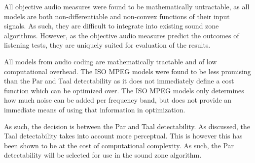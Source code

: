 All objective audio measures were found to be mathematically untractable, as all models are both non-differentiable and 
non-convex functions of their input signals.
As such, they are difficult to integrate into existing sound zone algorithms.
However, as the objective audio measures predict the outcomes of listening tests, they are uniquely suited for evaluation
of the results.

All models from audio coding are mathematically tractable and of low computational overhead.
The ISO MPEG models were found to be less promising than the Par and Taal detectability as it does not immediately 
define a cost function which can be optimized over.
The ISO MPEG models only determines how much noise can be added per frequency band, but does not provide an immediate 
means of using that information in optimization.

As such, the decision is between the Par and Taal detectability.
As discussed, the Taal detectability takes into account more perceptual.
This is however this has been shown to be at the cost of computational complexity.
As such, the Par detectability will be selected for use in the sound zone algorithm.


